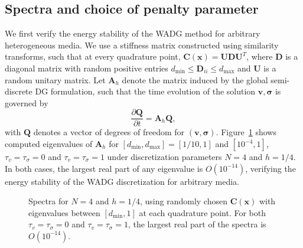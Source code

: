 \documentclass{siamart0216}
\newcommand{\pd}[2]{\frac{\partial#1}{\partial#2}}
\begin{document}
\subsection{Spectra and choice of penalty parameter}

We first verify the energy stability of the WADG method for arbitrary heterogeneous media.  We use a stiffness matrix constructed using similarity transforms, such that at every quadrature point, $\bm{C}(\bm{x}) = \bm{U}\bm{D}\bm{U}^{T}$, where $\bm{D}$ is a diagonal matrix with random positive entries $d_{\min} \leq \bm{D}_{ii} \leq d_{\max}$ and $\bm{U}$ is a random unitary matrix.  Let $\bm{A}_h$ denote the matrix induced by the global semi-discrete DG formulation, such that the time evolution of the solution $\bm{v},\bm{\sigma}$ is governed by
\[
\pd{\bm{Q}}{t} = \bm{A}_h\bm{Q},
\]
with $\bm{Q}$ denotes a vector of degrees of freedom for $(\bm{v},\bm{\sigma})$.  Figure~\ref{fig:spectra} shows computed eigenvalues of $\bm{A}_h$ for $[d_{\min},d_{\max}] = [1/10,1]$ and $[10^{-4},1]$, $\tau_v=\tau_\sigma = 0$ and $\tau_v=\tau_\sigma = 1$ under discretization parameters $N=4$ and $h = 1/4$.  In both cases, the largest real part of any eigenvalue is $O(10^{-14})$, verifying the energy stability of the WADG discretization for arbitrary media.  

\begin{figure}
\centering
{}
\caption{Spectra for $N=4$ and $h = 1/4$, using randomly chosen $\bm{C}(\bm{x})$ with eigenvalues between $[d_{\min}, 1]$ at each quadrature point.  For both $\tau_v = \tau_\sigma = 0$ and $\tau_v = \tau_\sigma = 1$, the largest real part of the spectra is $O(10^{-14})$.}
\label{fig:spectra}
\end{figure}
\end{document}
